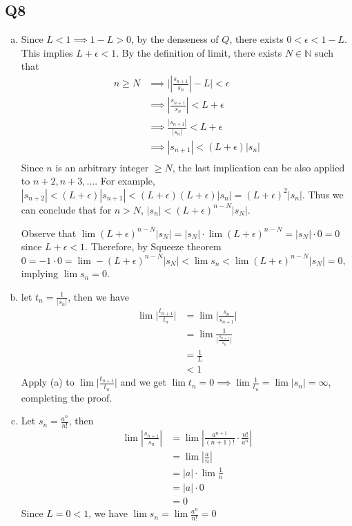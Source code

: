 \documentclass[12pt,lettersize]{article}
\newcommand{\N}{\mathbb{N}}
\begin{document}
\subsection*{Q8}
\begin{enumerate}[(a)]
	\item Since $L<1\implies1-L>0$, by the denseness of $Q$, there exists $0<\epsilon<1-L$. This implies $L+\epsilon<1$. By the definition of limit, there exists $N\in\N$ such that
	\begin{align*}
		n\geq N &\implies \Bigg|\left|\frac{s_{n+1}}{s_n}\right|-L\Bigg|<\epsilon\\
				&\implies \left|\frac{s_{n+1}}{s_n}\right|<L+\epsilon\\
				&\implies \frac{|s_{n+1}|}{|s_n|}<L+\epsilon\\
				&\implies |s_{n+1}|<(L+\epsilon)|s_n|\\
	\end{align*}
	Since $n$ is an arbitrary integer $\geq N$, the last implication can be also applied to $n+2, n+3,\dots$. For example, $|s_{n+2}|<(L+\epsilon)|s_{n+1}|<(L+\epsilon)(L+\epsilon)|s_n|=(L+\epsilon)^2|s_n|$. Thus we can conclude that for $n>N$, $|s_n|<(L+\epsilon)^{n-N}|s_N|$.
	
	Observe that $\lim(L+\epsilon)^{n-N}|s_N|=|s_N|\cdot\lim(L+\epsilon)^{n-N}=|s_N|\cdot0=0$ since $L+\epsilon<1$. Therefore, by Squeeze theorem $0=-1\cdot0=\lim-(L+\epsilon)^{n-N}|s_N|<\lim s_n<\lim(L+\epsilon)^{n-N}|s_N|=0$, implying $\lim s_n=0$.
	\item let $t_n=\frac{1}{|s_n|}$, then we have 
	\begin{align*}
		\lim\bigg|\frac{t_{n+1}}{t_n}\bigg| &= \lim\bigg|\frac{s_n}{s_{n+1}}\bigg|\\
										  &= \lim\frac{1}{\big|\frac{s_{n+1}}{s_n}\big|}\\
										  &= \frac{1}{L}\\
										  &< 1
	\end{align*}
	Apply (a) to $\lim\big|\frac{t_{n+1}}{t_n}\big|$ and we get $\lim t_n=0 \implies \lim \frac{1}{t_n}=\lim|s_n|=\infty$, completing the proof.
	\item Let $s_n=\frac{a^n}{n!}$, then 
	\begin{align*}
		\lim\left|\frac{s_{n+1}}{s_n}\right|&=\lim\left|\frac{a^{n+1}}{(n+1)!}\cdot\frac{n!}{a^n}\right|\\
											&=\lim\left|\frac{a}{n}\right|\\
											&=|a|\cdot\lim\frac{1}{n}\\
											&=|a|\cdot0\\
											&=0
	\end{align*}
	Since $L=0<1$, we have $\lim s_n=\lim \frac{a^n}{n!}=0$
\end{enumerate}
\newpage
\end{document}
